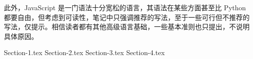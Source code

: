 \documentclass{PionpillNote-book}
\begin{document}
此外，JavaScript 是一门语法十分宽松的语言，其语法在某些方面甚至比 Python 都要自由，但考虑到可读性，笔记中只强调推荐的写法，至于一些可行但不推荐的写法，仅提示。相信读者都有其他高级语言基础，一些基本准则也只提出，不说明具体原因。

\date{\today}
\newpage

\tableofcontents

\newpage

\setcounter{page}{1} 
\pagestyle{fancy}


{Section-1.tex}
{Section-2.tex}
{Section-3.tex}
{Section-4.tex}
\end{document}
